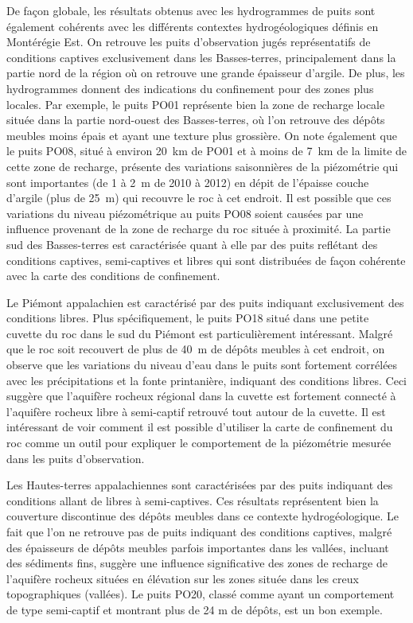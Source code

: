 \documentclass[WHATMANUAL.tex]{subfiles}
\begin{document}
De façon globale, les résultats obtenus avec les hydrogrammes de puits sont également cohérents avec les différents contextes hydrogéologiques définis en Montérégie Est. On retrouve les puits d’observation jugés représentatifs de conditions captives exclusivement dans les Basses-terres, principalement dans la partie nord de la région où on retrouve une grande épaisseur d’argile. De plus, les hydrogrammes donnent des indications du confinement pour des zones plus locales. Par exemple, le puits PO01 représente bien la zone de recharge locale située dans la partie nord-ouest des Basses-terres, où l'on retrouve des dépôts meubles moins épais et ayant une texture plus grossière. On note également que le puits PO08, situé à environ 20 km de PO01 et à moins de 7 km de la limite de cette zone de recharge, présente des variations saisonnières de la piézométrie qui sont importantes (de 1 à 2 m de 2010 à 2012) en dépit de l'épaisse couche d'argile (plus de 25 m) qui recouvre le roc à cet endroit. Il est possible que ces variations du niveau piézométrique au puits PO08 soient causées par une influence provenant de la zone de recharge du roc située à proximité. La partie sud des Basses-terres est caractérisée quant à elle par des puits reflétant des conditions captives, semi-captives et libres qui sont distribuées de façon cohérente avec la carte des conditions de confinement.

Le Piémont appalachien est caractérisé par des puits indiquant exclusivement des conditions libres. Plus spécifiquement, le puits PO18 situé dans une petite cuvette du roc dans le sud du Piémont est particulièrement intéressant. Malgré que le roc soit recouvert de plus de 40 m de dépôts meubles à cet endroit, on observe que les variations du niveau d'eau dans le puits sont fortement corrélées avec les précipitations et la fonte printanière, indiquant des conditions libres. 
Ceci suggère que l'aquifère rocheux régional dans la cuvette est fortement connecté à l'aquifère rocheux libre à semi-captif retrouvé tout autour de la cuvette. Il est intéressant de voir comment il est possible d'utiliser la carte de confinement  du roc comme un outil pour expliquer le comportement de la piézométrie mesurée dans les puits d'observation.

Les Hautes-terres appalachiennes sont caractérisées par des puits indiquant des conditions allant de libres à semi-captives. Ces résultats représentent bien la couverture discontinue des dépôts meubles dans ce contexte hydrogéologique. Le fait que l'on ne retrouve pas de puits indiquant des conditions captives, malgré des épaisseurs de dépôts meubles parfois importantes dans les vallées, incluant des sédiments fins, suggère une influence significative des zones de recharge de l’aquifère rocheux situées en élévation sur les zones située dans les creux topographiques (vallées). Le puits PO20, classé comme ayant un comportement de type semi-captif et montrant plus de 24 m de dépôts, est un bon exemple.
\end{document}

